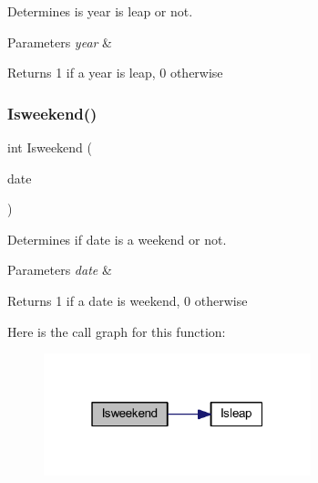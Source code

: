Determines is year is leap or not. 


\begin{DoxyParams}{Parameters}
{\em year} & \\
\hline
\end{DoxyParams}
\begin{DoxyReturn}{Returns}
1 if a year is leap, 0 otherwise 
\end{DoxyReturn}
\hypertarget{group__publicity_ga7bad5577543cdab533e3bc88669cd691}{}\label{group__publicity_ga7bad5577543cdab533e3bc88669cd691} 
\subsubsection{\texorpdfstring{Isweekend()}{Isweekend()}}
{\footnotesize\ttfamily int Isweekend (\begin{DoxyParamCaption}\item[{\hyperlink{structdate__t}{date\+\_\+t}}]{date }\end{DoxyParamCaption})}



Determines if date is a weekend or not. 


\begin{DoxyParams}{Parameters}
{\em date} & \\
\hline
\end{DoxyParams}
\begin{DoxyReturn}{Returns}
1 if a date is weekend, 0 otherwise 
\end{DoxyReturn}
Here is the call graph for this function\+:\nopagebreak
\begin{figure}[H]
\begin{center}
\leavevmode
\includegraphics[width=220pt]{group__publicity_ga7bad5577543cdab533e3bc88669cd691_cgraph}
\end{center}
\end{figure}
\hypertarget{group__publicity_ga7a04ef3aec214c81663352a9f4f35a65}{}\label{group__publicity_ga7a04ef3aec214c81663352a9f4f35a65} 
